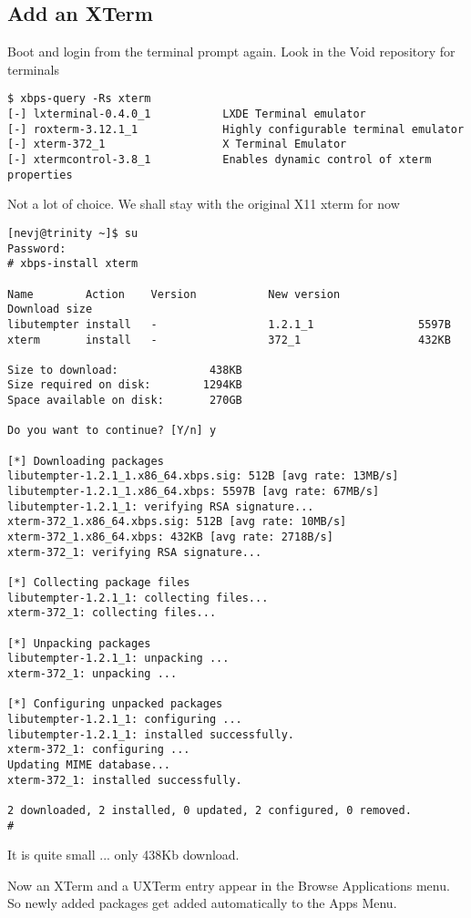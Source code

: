\documentclass{article}  %
\begin{document}
\subsection{Add an XTerm}
Boot and login from the terminal prompt again.
Look in the Void repository for terminals
\begin{verbatim}
$ xbps-query -Rs xterm
[-] lxterminal-0.4.0_1           LXDE Terminal emulator
[-] roxterm-3.12.1_1             Highly configurable terminal emulator
[-] xterm-372_1                  X Terminal Emulator
[-] xtermcontrol-3.8_1           Enables dynamic control of xterm properties
\end{verbatim}
Not a lot of choice. We shall stay with the original X11 xterm for now
\begin{verbatim}
[nevj@trinity ~]$ su
Password: 
# xbps-install xterm

Name        Action    Version           New version            Download size
libutempter install   -                 1.2.1_1                5597B 
xterm       install   -                 372_1                  432KB 

Size to download:              438KB
Size required on disk:        1294KB
Space available on disk:       270GB

Do you want to continue? [Y/n] y

[*] Downloading packages
libutempter-1.2.1_1.x86_64.xbps.sig: 512B [avg rate: 13MB/s]
libutempter-1.2.1_1.x86_64.xbps: 5597B [avg rate: 67MB/s]
libutempter-1.2.1_1: verifying RSA signature...
xterm-372_1.x86_64.xbps.sig: 512B [avg rate: 10MB/s]
xterm-372_1.x86_64.xbps: 432KB [avg rate: 2718B/s]
xterm-372_1: verifying RSA signature...

[*] Collecting package files
libutempter-1.2.1_1: collecting files...
xterm-372_1: collecting files...

[*] Unpacking packages
libutempter-1.2.1_1: unpacking ...
xterm-372_1: unpacking ...

[*] Configuring unpacked packages
libutempter-1.2.1_1: configuring ...
libutempter-1.2.1_1: installed successfully.
xterm-372_1: configuring ...
Updating MIME database...
xterm-372_1: installed successfully.

2 downloaded, 2 installed, 0 updated, 2 configured, 0 removed.
# 
\end{verbatim}
It is quite small ... only 438Kb download. 

Now an XTerm and a UXTerm entry appear in the Browse Applications menu. So newly added packages get added automatically to the Apps Menu. 
\end{document}
